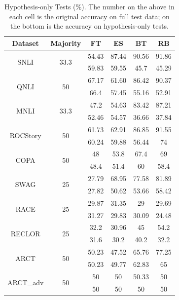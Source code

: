 \begin{table}[th]
\centering
\scriptsize
\begin{tabular}{c|c|c|c|c|c} \hline
Dataset & Majority & FT & ES & BT & RB \\ \hline
\multirow{2}{*}{SNLI} & \multirow{2}{*}{33.3} &  54.43& 87.44  &  90.56 & 91.86 \\
	& &   59.83  &    59.55  &  45.7& 45.29 \\ \hline
\multirow{2}{*}{QNLI}  & \multirow{2}{*}{50} &  67.17 & 61.60  &  86.42 & 90.37 \\
	&  &66.4   &  57.45    & 55.16 & 52.91 \\ \hline
\multirow{2}{*}{MNLI} & \multirow{2}{*}{33.3} & 47.2  & 54.63  & 83.42  & 87.21 \\
	& & 52.46&   54.57  &   36.66   &  37.84  \\ \hline
\multirow{2}{*}{ROCStory} & \multirow{2}{*}{50} & 61.73  &  62.91 &  86.85 &  91.55\\
	& &   60.24  &   59.88  & 56.44 & 74  \\ \hline
\multirow{2}{*}{COPA}   & \multirow{2}{*}{50} & 48  & 53.8  &  67.4 & 69 \\
	& &   48.4    &  51.4& 60 & 58.4\\ \hline
\multirow{2}{*}{SWAG}  & \multirow{2}{*}{25} & 27.79  &  68.95 &  77.58 &  81.89\\
	& &  27.82  &   50.62   &  53.66& 58.42 \\ \hline
\multirow{2}{*}{RACE}  & \multirow{2}{*}{25} & 29.87  &  31.35 & 29  & 29.69 \\
	& &    31.27  &  29.83    & 30.09 &  24.48\\ \hline
\multirow{2}{*}{RECLOR} & \multirow{2}{*}{25} & 32.2  & 30.96  &  45 & 54.2 \\
	& &   31.6 &  30.2    &40.2 & 32.2 \\ \hline
\multirow{2}{*}{ARCT}& \multirow{2}{*}{50} &  50.23 & 47.52  & 65.76  & 77.25 \\ 
	& &  50.23   &  49.77    & 62.83 & 65\\ \hline
\multirow{2}{*}{ARCT\_adv}& \multirow{2}{*}{50} & 50  &50 & 50.33  & 50 \\
	&  &  50  &  50    & 50 & 50\\ \hline
\end{tabular}
\caption{Hypothesis-only Tests (\%). The number on the above in each cell is the original accuracy on
full test data; on the bottom is the accuracy on hypothesis-only tests.}\label{tab:hypoonly}
\end{table}

